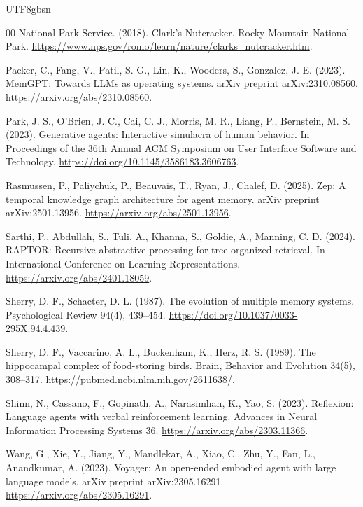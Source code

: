 \documentclass[a4paper,fleqn]{cas-sc}
\begin{document}
\begin{CJK*}{UTF8}{gbsn}
\begin{thebibliography}{00}
National Park Service. (2018). Clark's Nutcracker. Rocky Mountain National Park. \url{https://www.nps.gov/romo/learn/nature/clarks_nutcracker.htm}.

Packer, C., Fang, V., Patil, S. G., Lin, K., Wooders, S., Gonzalez, J. E. (2023). MemGPT: Towards LLMs as operating systems. arXiv preprint arXiv:2310.08560. \url{https://arxiv.org/abs/2310.08560}.

Park, J. S., O'Brien, J. C., Cai, C. J., Morris, M. R., Liang, P., Bernstein, M. S. (2023). Generative agents: Interactive simulacra of human behavior. In Proceedings of the 36th Annual ACM Symposium on User Interface Software and Technology. \url{https://doi.org/10.1145/3586183.3606763}.

Rasmussen, P., Paliychuk, P., Beauvais, T., Ryan, J., Chalef, D. (2025). Zep: A temporal knowledge graph architecture for agent memory. arXiv preprint arXiv:2501.13956. \url{https://arxiv.org/abs/2501.13956}.

Sarthi, P., Abdullah, S., Tuli, A., Khanna, S., Goldie, A., Manning, C. D. (2024). RAPTOR: Recursive abstractive processing for tree-organized retrieval. In International Conference on Learning Representations. \url{https://arxiv.org/abs/2401.18059}.

Sherry, D. F., Schacter, D. L. (1987). The evolution of multiple memory systems. Psychological Review 94(4), 439--454. \url{https://doi.org/10.1037/0033-295X.94.4.439}.

Sherry, D. F., Vaccarino, A. L., Buckenham, K., Herz, R. S. (1989). The hippocampal complex of food-storing birds. Brain, Behavior and Evolution 34(5), 308--317. \url{https://pubmed.ncbi.nlm.nih.gov/2611638/}.

Shinn, N., Cassano, F., Gopinath, A., Narasimhan, K., Yao, S. (2023). Reflexion: Language agents with verbal reinforcement learning. Advances in Neural Information Processing Systems 36. \url{https://arxiv.org/abs/2303.11366}.

Wang, G., Xie, Y., Jiang, Y., Mandlekar, A., Xiao, C., Zhu, Y., Fan, L., Anandkumar, A. (2023). Voyager: An open-ended embodied agent with large language models. arXiv preprint arXiv:2305.16291. \url{https://arxiv.org/abs/2305.16291}.


\end{thebibliography}
\end{CJK*}
\end{document}

